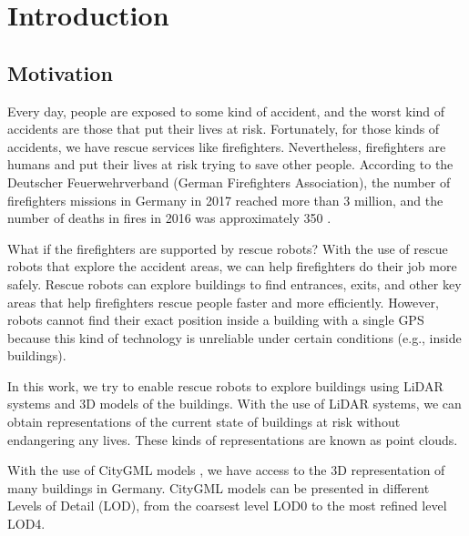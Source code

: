

    \chapter{Introduction}

    \section{Motivation}
    
        Every day, people are exposed to some kind of accident, and the worst kind of accidents are those that put their lives at risk.
        Fortunately, for those kinds of accidents, we have rescue services like firefighters.
        Nevertheless, firefighters are humans and put their lives at risk trying to save other people.
        According to the Deutscher Feuerwehrverband (German Firefighters Association), the number of firefighters missions in Germany in 2017 
        reached more than 3 million, and the number of deaths in fires in 2016 was approximately 350 \cite{DeutscherFeuerweherverband_online}.
        \par
        What if the firefighters are supported by rescue robots?
        With the use of rescue robots that explore the accident areas, we can help firefighters do their job more safely.
        Rescue robots can explore buildings to find entrances, exits, and other key areas that help firefighters rescue people faster and more efficiently.
        However, robots cannot find their exact position inside a building with a single GPS because this kind of technology is unreliable under certain conditions 
        (e.g., inside buildings).
        \par
        In this work, we try to enable rescue robots to explore buildings using LiDAR systems and 3D models of the buildings.
        With the use of LiDAR systems, we can obtain representations of the current state of buildings at risk without endangering any lives. 
        These kinds of representations are known as point clouds.
        \par
        With the use of CityGML models \cite{Groger_2012_OGC}, we have access to the 3D representation of many buildings in Germany.
        CityGML models can be presented in different Levels of Detail (LOD), from the coarsest level LOD0 to the most refined level LOD4.
